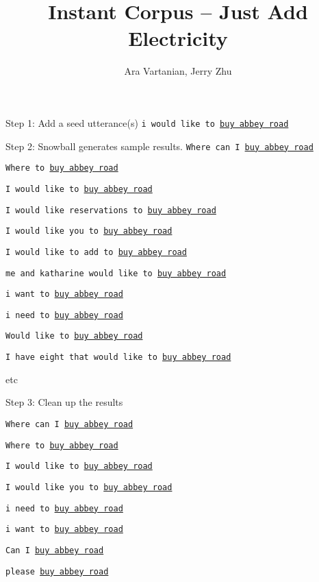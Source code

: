 \documentclass[12pt]{beamer}
\title{Instant Corpus -- Just Add Electricity}
\author[Author]{Ara Vartanian, Jerry Zhu}
\institute{Department of Computer Sciences, University of Wisconsin-Madison}
\begin{document}
\begin{frame}
  \titlepage
\end{frame}

\begin{frame}{Step 1: Add a seed utterance(s)}
\texttt{i would like to \underline{buy abbey road}}
\end{frame}
  
\begin{frame}{Step 2: Snowball generates sample results.}
\texttt{Where can I \underline{buy abbey road}}

\texttt{Where to \underline{buy abbey road}}

\texttt{I would like to \underline{buy abbey road}}

\texttt{I would like reservations to \underline{buy abbey road}}

\texttt{I would like you to \underline{buy abbey road}}

\texttt{I would like to add to \underline{buy abbey road}}

\texttt{me and katharine would like to \underline{buy abbey road}}

\texttt{i want to \underline{buy abbey road}}

\texttt{i need to \underline{buy abbey road}}

\texttt{Would like to \underline{buy abbey road}}

\texttt{I have eight that would like to \underline{buy abbey road}}

etc
\end{frame}

\begin{frame}{Step 3: Clean up the results}

  
\texttt{Where can I \underline{buy abbey road}}
  
\texttt{Where to \underline{buy abbey road}}
 
\texttt{I would like to \underline{buy abbey road}}
  
\texttt{I would like you to \underline{buy abbey road}}
  
\texttt{i need to \underline{buy abbey road}}
  
\texttt{i want to \underline{buy abbey road}}
  
\texttt{Can I \underline{buy abbey road}}
  
\texttt{please \underline{buy abbey road}}
  
\end{frame}
\end{document}
